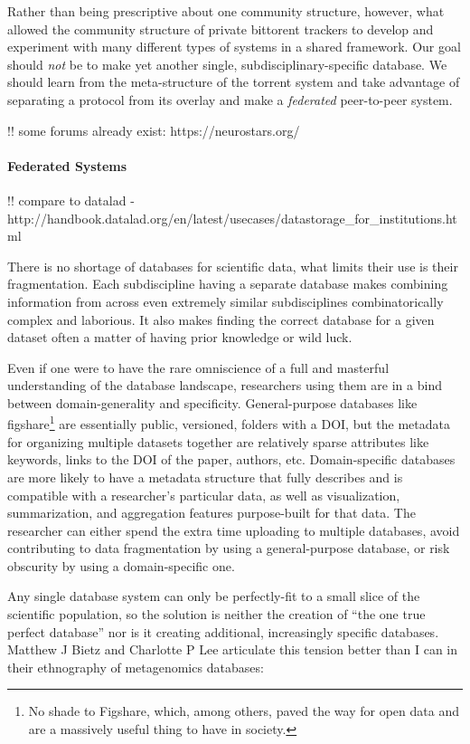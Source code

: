 \documentclass{article}
\begin{document}
Rather than being prescriptive about one community structure, however,
what allowed the community structure of private bittorent trackers to
develop and experiment with many different types of systems in a shared
framework. Our goal should \emph{not} be to make yet another single,
subdisciplinary-specific database. We should learn from the
meta-structure of the torrent system and take advantage of separating a
protocol from its overlay and make a \emph{federated} peer-to-peer
system.

!! some forums already exist: https://neurostars.org/

\hypertarget{federated-systems}{%
\paragraph{Federated Systems}\label{federated-systems}}

!! compare to datalad -
http://handbook.datalad.org/en/latest/usecases/datastorage\_for\_institutions.html

There is no shortage of databases for scientific data, what limits their
use is their fragmentation. Each subdiscipline having a separate
database makes combining information from across even extremely similar
subdisciplines combinatorically complex and laborious. It also makes
finding the correct database for a given dataset often a matter of
having prior knowledge or wild luck.

Even if one were to have the rare omniscience of a full and masterful
understanding of the database landscape, researchers using them are in a
bind between domain-generality and specificity. General-purpose
databases like figshare\footnote{No shade to Figshare, which, among
  others, paved the way for open data and are a massively useful thing
  to have in society.} are essentially public, versioned, folders with a
DOI, but the metadata for organizing multiple datasets together are
relatively sparse attributes like keywords, links to the DOI of the
paper, authors, etc. Domain-specific databases are more likely to have a
metadata structure that fully describes and is compatible with a
researcher's particular data, as well as visualization, summarization,
and aggregation features purpose-built for that data. The researcher can
either spend the extra time uploading to multiple databases, avoid
contributing to data fragmentation by using a general-purpose database,
or risk obscurity by using a domain-specific one.

Any single database system can only be perfectly-fit to a small slice of
the scientific population, so the solution is neither the creation of
``the one true perfect database'' nor is it creating additional,
increasingly specific databases. Matthew J Bietz and Charlotte P Lee
articulate this tension better than I can in their ethnography of
metagenomics databases:
\end{document}
